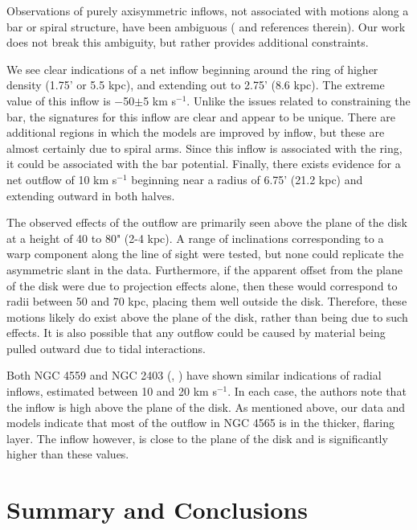 \documentclass{emulateapj}
\begin{document}
\par
     Observations of purely axisymmetric inflows, not associated with motions along a bar or spiral structure, have been ambiguous (\citealt{2004ApJ...605..183W} and references therein).  Our work does not break this  ambiguity, but rather provides additional constraints. 

\par
    We see clear indications of a net inflow beginning around the ring of higher density (1.75' or 5.5 kpc), and extending out to 2.75' (8.6 kpc).  The extreme value of this inflow is $-$50$\pm$5 km s$^{-1}$.  Unlike the issues related to constraining the bar, the signatures for this inflow are clear and appear to be unique. There are additional regions in which the models are improved by inflow, but these are almost certainly due to spiral arms.  Since this inflow is associated with the ring, it could be associated with the bar potential. Finally, there exists evidence for a net outflow of 10 km s$^{-1}$ beginning near a radius of 6.75' (21.2 kpc) and extending outward in both halves.  

\par
    The observed effects of the outflow are primarily seen above the plane of the disk at a height of 40 to 80" (2-4 kpc).  A range of inclinations corresponding to a warp component along the line of sight were tested, but none could replicate the asymmetric slant in the data.  Furthermore, if the apparent offset from the plane of the disk were due to projection effects alone, then these would correspond to radii between 50 and 70 kpc, placing them well outside the disk. Therefore, these motions likely do exist above the plane of the disk, rather than being due to such effects.  It is also possible that any outflow could be caused by material being pulled outward due to tidal interactions.  

\par
    Both NGC 4559 \citep{2005A&A...439..947B} and NGC 2403 (\citealt{2000A&A...356L..49S}, \citealt{2002AJ....123.3124F}) have shown similar indications of radial inflows, estimated between 10 and 20 km s$^{-1}$.  In each case, the authors note that the inflow is high above the plane of the disk.  As mentioned above, our data and models indicate that most of the outflow in NGC 4565 is in the thicker, flaring layer.  The inflow however, is close to the plane of the disk and is significantly higher than these values.  


\section{Summary and Conclusions} \label{Section7}
\end{document}
